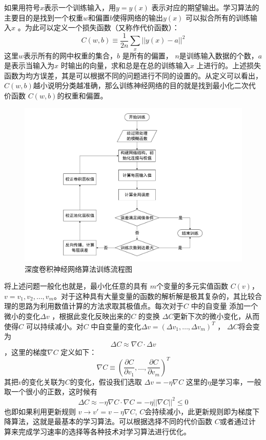 如果用符号$x $表示一个训练输入，用$y=y(x) $ 表示对应的期望输出。学习算法的主要目的是找到一个权重$w$和偏置$b$使得网络的输出$y(x) $ 可以拟合所有的训练输入$x$ 。为此可以定义一个损失函数（又称作代价函数）：
\begin{equation}
  C(w,b)\equiv \frac{1}{2n}\sum_x||y(x)-a||^2 
\end{equation}
这里$w$表示所有的网中权重的集合，$b$ 是所有的偏置， $n$是训练输入数据的个数，$a$ 是表示当输入为$x$ 时输出的向量，求和总是在总的训练输入$x$ 上进行的。上述损失函数为均方误差，其是可以根据不同的问题进行不同的设置的。从定义可以看出， $C(w,b) $越小说明分类越准确，那么训练神经网络的目的就是找到最小化二次代价函数 $C(w,b) $的权重和偏置。
\begin{figure}
	\centering
	\includegraphics[width=\textwidth]{figures/networks/cnn_flow}
	\caption{深度卷积神经网络算法训练流程图}
\end{figure}
将上述问题一般化也就是，最小化任意的具有 $m $个变量的多元实值函数 $C(v) $， $v=v_1,v_2,\dots,v_m $。对于这种具有大量变量的函数的解析解是极其复杂的，其比较合理的思路为利用数值计算的方法求取其极值点。每次对于$C $ 中的自变量 添加一个微小的变化$\Delta v $ ，根据此变化反映出来的$C $ 的变换 $\Delta C $更新下次的微小变化，从而使得$C $ 可以持续减小。对$C $ 中自变量的变化$\Delta v=(\Delta v_1,\dots,\Delta v_m)^T $ ， $\Delta C $将会变为
\begin{equation}
    \Delta C \approx \nabla C \cdot \Delta v 
\end{equation}
，这里的梯度$\nabla C $ 定义如下：
\begin{equation}
\nabla C \equiv (\frac{\partial C}{\partial v_1},\dots,\frac{\partial C}{\partial v_m})^T 
\end{equation}
其把$v$的变化关联为$C$的变化，假设我们选取
$\Delta v=-\eta \nabla C $
这里的$\eta $是学习率，一般取一个很小的正数，这时候有
\begin{equation}
\Delta C \approx -\eta\nabla C\cdot\nabla C=-\eta||\nabla C||^2 \leq 0  
\end{equation}
也即如果利用更新规则
$v \rightarrow v'=v-\eta \nabla C$,
$C $会持续减小，此更新规则即为梯度下降算法，这就是最基本的学习算法。可以根据选择不同的代价函数 $C $或者通过计算来完成学习速率的选择等各种技术对学习算法进行优化。

